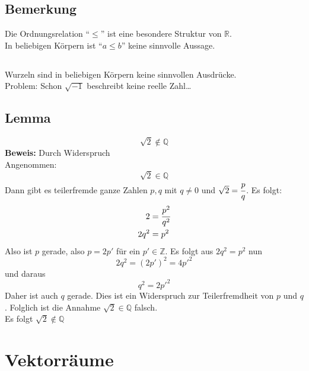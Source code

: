 \subsection{Bemerkung}
Die Ordnungsrelation \enquote{$\leq$} ist eine besondere Struktur von $\mathds{R}$. \\
In beliebigen Körpern ist \enquote{$a \leq b$} keine sinnvolle Aussage.

\subsection{}
Wurzeln sind in beliebigen Körpern keine sinnvollen Ausdrücke. \\
Problem: Schon $\sqrt{-1}$ beschreibt keine reelle Zahl…

\subsection{Lemma}
\[
\sqrt{2} \not\in \mathds{Q}
\]
\textbf{Beweis:} Durch Widerspruch \\
Angenommen:
\[
\sqrt{2} \in \mathds{Q}
\]
Dann gibt es teilerfremde ganze Zahlen $p,q$ mit $q \not= 0$ und $\sqrt{2}=\cfrac{p}{q}$. Es folgt:
\begin{align*}
2 &= \cfrac{p^2}{q^2} \\
2 q^2 &= p^2
\end{align*}
Also ist $p$ gerade, also $p=2 p'$ für ein $p' \in \mathds{Z}$. Es folgt aus $2 q^2 =p^2 $ nun 
\[
2 q^2 = (2p')^2 = 4 p'^2
\]
und daraus
\[
q^2 = 2 p'^2
\]
Daher ist auch $q$ gerade. Dies ist ein Widerspruch zur Teilerfremdheit von $p$ und $q$. Folglich ist die Annahme $\sqrt{2} \in \mathds{Q}$ falsch. \\
Es folgt $\sqrt{2} \not\in \mathds{Q}$

\section{Vektorräume}

